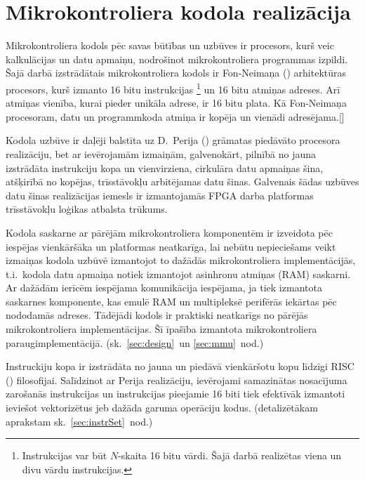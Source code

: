 \section{Mikrokontroliera kodola realizācija} \label{sec:cpu}
	Mikrokontroliera kodols pēc savas būtības un uzbūves ir procesors,
	kurš veic kalkulācijas un datu apmaiņu, nodrošinot mikrokontroliera
	programmas izpildi.
	Šajā darbā izstrādātais mikrokontroliera kodols ir 
	Fon-Neimaņa () arhitektūras pro\-ce\-sors, kurš
	izmanto 16 bitu instrukcijas%
		\footnote{Instrukcijas var būt $N$-skaita 16 bitu vārdi. 
		Šajā darbā realizētas viena un divu vārdu instrukcijas.}
	un 16 bitu atmiņas adreses. Arī atmiņas vienība, kurai pieder unikāla
	adrese, ir 16 bitu plata. Kā Fon-Neimaņa procesoram, datu un
	programmkoda atmiņa ir kopēja un vienādi adresējama.[\todo]
	
	Kodola uzbūve ir daļēji balstīta uz D.~Perija () grāmatas%
	\cite{Perry-VHDL} piedāvāto procesora reali\-zā\-ciju, 
	bet ar ievērojamām izmaiņām, galvenokārt, pilnībā no jauna izstrādāta 
	instrukciju kopa un vienvirziena,
	cirkulāra datu apmaiņas šina, atšķirībā no kopējas,
	trīs\-stāvokļu arbitējamas datu šinas.
	Galvenais šādas uzbūves datu šinas realizācijas iemesls
	ir izmantojamās  FPGA darba platformas trīs\-stāvokļu
	loģikas atbalsta \mbox{trūkums.\cite[18.~lpp.]{FusionFAQ}}
	
	Kodola saskarne ar pārējām mikrokontroliera komponentēm ir izveidota
	pēc iespējas vienkāršāka un platformas neatkarīga, lai nebūtu nepieciešams
	veikt izmaiņas kodola uzbūvē izmantojot to dažādās mikrokontroliera
	implementācijās, t.i.~kodola datu apmaiņa notiek izmantojot
	asinhronu atmiņas (RAM)	saskarni. Ar dažādām ierīcēm iespējama
	komunikācija iespējama, ja tiek izmantota saskarnes komponente, kas
	emulē RAM un multipleksē perifērās iekārtas pēc nododamās adreses.
	Tādējādi kodols	ir praktiski neatkarīgs no pārējās 
	mikrokontroliera implementācijas.
	Šī īpašība izmantota mikrokontroliera paraugimplementācijā.
	(sk.~\ref{sec:design}~un \ref{sec:mmu}~nod.)
	
	Instruckiju kopa ir izstrādāta no jauna un piedāvā vienkāršotu
	kopu līdzīgi RISC ()
	filo\-so\-fijai. Salīdzinot ar Perija realizāciju, ievērojami samazinātas
	nosacījuma zarošanās instrukcijas un instrukcijas pieejamie 16 biti
	tiek efektīvāk izmantoti ieviešot vektorizētus jeb dažāda garuma
	operāciju kodus. (detalizētākam aprakstam sk.~\ref{sec:instrSet}~nod.)
	
